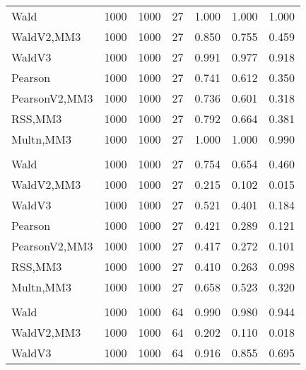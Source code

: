 \documentclass[
]{article}
\begin{document}
\begin{table}[H]
{\begin{tabular}[t]{lrrrrrr}
\hspace{1em}Wald & 1000 & 1000 & 27 & 1.000 & 1.000 & 1.000\\
\hspace{1em}WaldV2,MM3 & 1000 & 1000 & 27 & 0.850 & 0.755 & 0.459\\
\hspace{1em}WaldV3 & 1000 & 1000 & 27 & 0.991 & 0.977 & 0.918\\
\hspace{1em}Pearson & 1000 & 1000 & 27 & 0.741 & 0.612 & 0.350\\
\hspace{1em}PearsonV2,MM3 & 1000 & 1000 & 27 & 0.736 & 0.601 & 0.318\\
\hspace{1em}RSS,MM3 & 1000 & 1000 & 27 & 0.792 & 0.664 & 0.381\\
\hspace{1em}Multn,MM3 & 1000 & 1000 & 27 & 1.000 & 1.000 & 0.990\\
\addlinespace[0.3em]
\multicolumn{7}{l}{\textbf{2F 10V}}\\
\hspace{1em}Wald & 1000 & 1000 & 27 & 0.754 & 0.654 & 0.460\\
\hspace{1em}WaldV2,MM3 & 1000 & 1000 & 27 & 0.215 & 0.102 & 0.015\\
\hspace{1em}WaldV3 & 1000 & 1000 & 27 & 0.521 & 0.401 & 0.184\\
\hspace{1em}Pearson & 1000 & 1000 & 27 & 0.421 & 0.289 & 0.121\\
\hspace{1em}PearsonV2,MM3 & 1000 & 1000 & 27 & 0.417 & 0.272 & 0.101\\
\hspace{1em}RSS,MM3 & 1000 & 1000 & 27 & 0.410 & 0.263 & 0.098\\
\hspace{1em}Multn,MM3 & 1000 & 1000 & 27 & 0.658 & 0.523 & 0.320\\
\addlinespace[0.3em]
\multicolumn{7}{l}{\textbf{3F 15V}}\\
\hspace{1em}Wald & 1000 & 1000 & 64 & 0.990 & 0.980 & 0.944\\
\hspace{1em}WaldV2,MM3 & 1000 & 1000 & 64 & 0.202 & 0.110 & 0.018\\
\hspace{1em}WaldV3 & 1000 & 1000 & 64 & 0.916 & 0.855 & 0.695\\

\end{tabular}}
\end{table}
\end{document}
